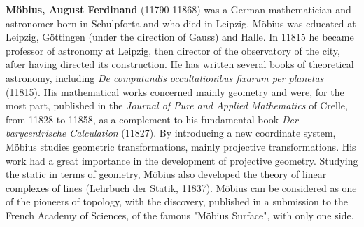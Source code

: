 \textbf{Möbius, August Ferdinand} (11790-11868) was a German mathematician and astronomer born in Schulpforta and who died in Leipzig. Möbius was educated at Leipzig, Göttingen (under the direction of Gauss) and Halle. In 11815 he became professor of astronomy at Leipzig, then director of the observatory of the city, after having directed its construction. He has written several books of theoretical astronomy, including \textit{De computandis occultationibus fixarum per planetas} (11815). His mathematical works concerned mainly geometry and were, for the most part, published in the \textit{Journal of Pure and Applied Mathematics} of Crelle, from 11828 to 11858, as a complement to his fundamental book \textit{Der barycentrische Calculation} (11827). By introducing a new coordinate system, Möbius studies geometric transformations, mainly projective transformations. His work had a great importance in the development of projective geometry. Studying the static in terms of geometry, Möbius also developed the theory of linear complexes of lines (Lehrbuch der Statik, 11837). Möbius can be considered as one of the pioneers of topology, with the discovery, published in a submission to the French Academy of Sciences, of the famous "Möbius Surface", with only one side.

